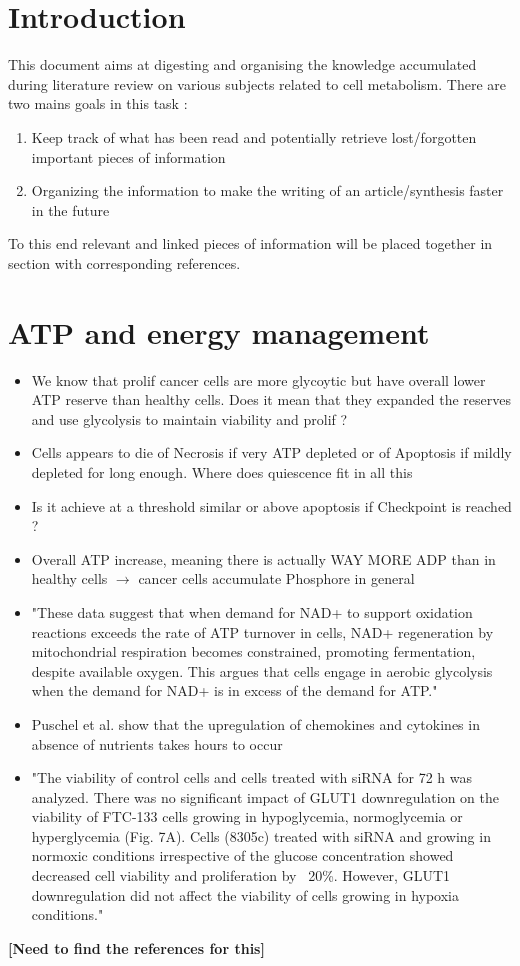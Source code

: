 \documentclass[11pt,a4paper]{article}
\begin{document}
\tableofcontents

\section{Introduction}
This document aims at digesting and organising the knowledge accumulated during literature review on various subjects related to cell metabolism. There are two mains goals in this task : 
\begin{enumerate}
\item Keep track of what has been read and potentially retrieve lost/forgotten important pieces of information
\item Organizing the information to make the writing of an article/synthesis faster in the future
\end{enumerate}
To this end relevant and linked pieces of information will be placed together in section with corresponding references.


\section{ATP and energy management}
\begin{itemize}
\item We know that prolif cancer cells are more glycoytic but have overall lower ATP reserve than healthy cells. Does it mean that they expanded the reserves and use glycolysis to maintain viability and prolif ? 
\item Cells appears to die of Necrosis if very ATP depleted or of Apoptosis if mildly depleted for long enough.  Where does quiescence fit in all this 
\item Is it achieve at a threshold similar or above apoptosis if Checkpoint is reached ? 
\item Overall ATP increase, meaning there is actually WAY MORE ADP than in healthy cells $\rightarrow$ cancer cells accumulate Phosphore in general
\item "These data suggest that when demand for NAD+ to support oxidation reactions exceeds the rate of ATP turnover in cells, NAD+ regeneration by mitochondrial respiration becomes constrained, promoting fermentation, despite available oxygen. This argues that cells engage in aerobic glycolysis when the demand for NAD+ is in excess of the demand for ATP."\cite{Luengo2020}
\item Puschel et al. show that the upregulation of chemokines and cytokines in absence of nutrients takes hours to occur \cite{Puschel}

\item "The viability of control cells and cells treated with siRNA for 72 h was analyzed. There was no significant impact of GLUT1 downregulation on the viability of FTC-133 cells growing in hypoglycemia, normoglycemia or hyperglycemia (Fig. 7A). Cells (8305c) treated with siRNA and growing in normoxic conditions irrespective of the glucose concentration showed decreased cell viability and proliferation by ~20\%. However, GLUT1 downregulation did not affect the viability of cells growing in hypoxia conditions."\cite{Jozwiak2014}
\end{itemize}
\textbf{[Need to find the references for this]}
\end{document}
